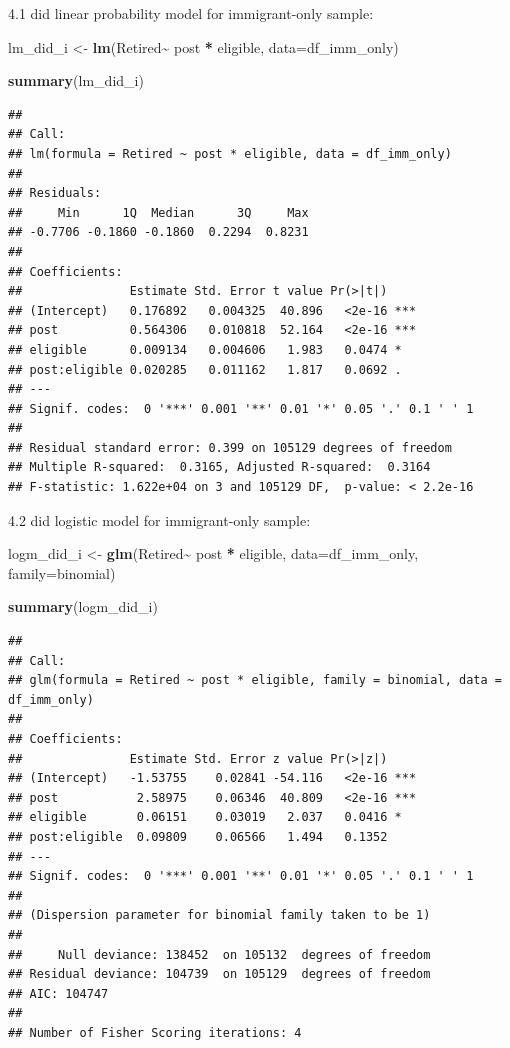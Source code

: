 \documentclass[
]{article}
\newenvironment{Shaded}{\begin{snugshade}}{\end{snugshade}}
\newcommand{\AttributeTok}[1]{\textcolor[rgb]{0.13,0.29,0.53}{#1}}
\newcommand{\FunctionTok}[1]{\textcolor[rgb]{0.13,0.29,0.53}{\textbf{#1}}}
\newcommand{\NormalTok}[1]{#1}
\newcommand{\OtherTok}[1]{\textcolor[rgb]{0.56,0.35,0.01}{#1}}
\newcommand{\SpecialCharTok}[1]{\textcolor[rgb]{0.81,0.36,0.00}{\textbf{#1}}}
\begin{document}
4.1 did linear probability model for immigrant-only sample:

\begin{Shaded}
\begin{Highlighting}[]
\NormalTok{lm\_did\_i }\OtherTok{\textless{}{-}} \FunctionTok{lm}\NormalTok{(Retired}\SpecialCharTok{\textasciitilde{}}\NormalTok{ post }\SpecialCharTok{*}\NormalTok{ eligible, }\AttributeTok{data=}\NormalTok{df\_imm\_only)}

\FunctionTok{summary}\NormalTok{(lm\_did\_i)}
\end{Highlighting}
\end{Shaded}

\begin{verbatim}
## 
## Call:
## lm(formula = Retired ~ post * eligible, data = df_imm_only)
## 
## Residuals:
##     Min      1Q  Median      3Q     Max 
## -0.7706 -0.1860 -0.1860  0.2294  0.8231 
## 
## Coefficients:
##               Estimate Std. Error t value Pr(>|t|)    
## (Intercept)   0.176892   0.004325  40.896   <2e-16 ***
## post          0.564306   0.010818  52.164   <2e-16 ***
## eligible      0.009134   0.004606   1.983   0.0474 *  
## post:eligible 0.020285   0.011162   1.817   0.0692 .  
## ---
## Signif. codes:  0 '***' 0.001 '**' 0.01 '*' 0.05 '.' 0.1 ' ' 1
## 
## Residual standard error: 0.399 on 105129 degrees of freedom
## Multiple R-squared:  0.3165, Adjusted R-squared:  0.3164 
## F-statistic: 1.622e+04 on 3 and 105129 DF,  p-value: < 2.2e-16
\end{verbatim}

4.2 did logistic model for immigrant-only sample:

\begin{Shaded}
\begin{Highlighting}[]
\NormalTok{logm\_did\_i }\OtherTok{\textless{}{-}} \FunctionTok{glm}\NormalTok{(Retired}\SpecialCharTok{\textasciitilde{}}\NormalTok{ post }\SpecialCharTok{*}\NormalTok{ eligible, }\AttributeTok{data=}\NormalTok{df\_imm\_only, }\AttributeTok{family=}\NormalTok{binomial)}

\FunctionTok{summary}\NormalTok{(logm\_did\_i)}
\end{Highlighting}
\end{Shaded}

\begin{verbatim}
## 
## Call:
## glm(formula = Retired ~ post * eligible, family = binomial, data = df_imm_only)
## 
## Coefficients:
##               Estimate Std. Error z value Pr(>|z|)    
## (Intercept)   -1.53755    0.02841 -54.116   <2e-16 ***
## post           2.58975    0.06346  40.809   <2e-16 ***
## eligible       0.06151    0.03019   2.037   0.0416 *  
## post:eligible  0.09809    0.06566   1.494   0.1352    
## ---
## Signif. codes:  0 '***' 0.001 '**' 0.01 '*' 0.05 '.' 0.1 ' ' 1
## 
## (Dispersion parameter for binomial family taken to be 1)
## 
##     Null deviance: 138452  on 105132  degrees of freedom
## Residual deviance: 104739  on 105129  degrees of freedom
## AIC: 104747
## 
## Number of Fisher Scoring iterations: 4
\end{verbatim}
\end{document}
